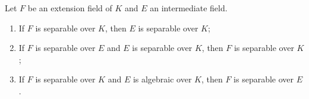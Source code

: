 Let $F$ be an extension field of $K$ and $E$ an intermediate field.
\begin{enumerate}
\item[(i)] If $F$ is separable over $K$, then $E$ is separable over $K$;
\item[(ii)] If $F$ is separable over $E$ and $E$ is separable over $K$, then $F$ is separable over $K$;
\item[(iii)] If $F$ is separable over $K$ and $E$ is algebraic over $K$, then $F$ is separable over $E$.
\end{enumerate}
